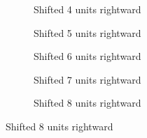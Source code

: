 \documentclass[12pt]{article}
\begin{document}
\begin{figure}
\label{fig:shift}
\centering
\begin{subfigure}[t]{0.5\textwidth}
  \centering
  \caption{Shifted 4 units rightward}
  \label{fig:square0}
\end{subfigure}

\begin{subfigure}[t]{0.5\textwidth}
  \centering
  \caption{Shifted 5 units rightward}
  \label{fig:square4}
\end{subfigure}

\begin{subfigure}[t]{0.5\textwidth}
  \centering
  \caption{Shifted 6 units rightward}
  \label{fig:square8}
\end{subfigure}

\begin{subfigure}[t]{0.5\textwidth}
  \centering
  \caption{Shifted 7 units rightward}
  \label{fig:square12}
\end{subfigure}


\begin{subfigure}[t]{0.5\textwidth}
  \centering
  \caption{Shifted 8 units rightward}
  \label{fig:square16}
\end{subfigure}
\end{figure}
\end{document}
